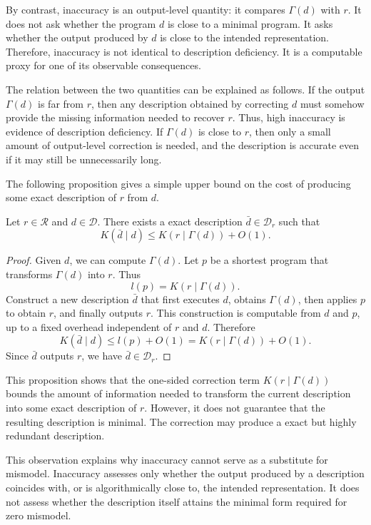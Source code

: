 By contrast, inaccuracy is an output-level quantity: it compares \(\Gamma(d)\) with \(r\). It does not ask whether the program \(d\) is close to a minimal program. It asks whether the output produced by \(d\) is close to the intended representation. Therefore, inaccuracy is not identical to description deficiency. It is a computable proxy for one of its observable consequences.

The relation between the two quantities can be explained as follows. If the output \(\Gamma(d)\) is far from \(r\), then any description obtained by correcting \(d\) must somehow provide the missing information needed to recover \(r\). Thus, high inaccuracy is evidence of description deficiency. If \(\Gamma(d)\) is close to \(r\), then only a small amount of output-level correction is needed, and the description is accurate even if it may still be unnecessarily long.

The following proposition gives a simple upper bound on the cost of producing some exact description of \(r\) from \(d\).

\begin{proposition}
\label{prop:inaccuracy_valid_description_bound}
Let $r \in \mathcal R$ and $d \in \mathcal D$. There exists a exact description $\bar d \in \mathcal D_r$ such that
\[
K(\bar d \mid d) \leq K(r\mid \Gamma(d)) + O(1).
\]
\end{proposition}
\begin{proof}
Given $d$, we can compute $\Gamma(d)$. Let $p$ be a shortest program that transforms $\Gamma(d)$ into $r$. Thus
\[
l(p) = K(r\mid \Gamma(d)).
\]
Construct a new description $\bar d$ that first executes $d$, obtains $\Gamma(d)$, then applies $p$ to obtain $r$, and finally outputs $r$. This construction is computable from $d$ and $p$, up to a fixed overhead independent of $r$ and $d$. Therefore
\[
K(\bar d\mid d) \leq l(p)+O(1) = K(r\mid \Gamma(d))+O(1).
\]
Since $\bar d$ outputs $r$, we have $\bar d \in \mathcal D_r$.
\end{proof}

This proposition shows that the one-sided correction term \(K(r\mid \Gamma(d))\) bounds the amount of information needed to transform the current description into some exact description of \(r\). However, it does not guarantee that the resulting description is minimal. The correction may produce a exact but highly redundant description.

This observation explains why inaccuracy cannot serve as a substitute for mismodel. Inaccuracy assesses only whether the output produced by a description coincides with, or is algorithmically close to, the intended representation. It does not assess whether the description itself attains the minimal form required for zero mismodel.

